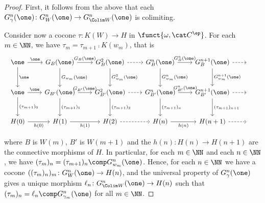 \begin{proof}
First, it follows from the above that each
$G_\gamma^n(\one) \colon G_W^n(\one) \to G_{\Colim W}^n(\one)$
is colimiting.

Consider now a cocone
$\tau \colon K(W) \to H$ in $\funct{\omega,\cat C^\ep}$.
For each $m \in \NN$, we have
$\tau_m = \tau_{m+1} \comp K(w_m)$,
that is
\begin{equation}
\label{diag:proof:scott:taucocone}
\begin{array}{c}
\begin{tikzcd}[column sep=2.14em, row sep=large]

  \one
  \arrow{r}[above]{\one}
  \arrow{d}{\one}
& G_{B}(\one)
   \arrow{r}[above]{G_{B}(\one)}
   \arrow{d}{G_{w_m}(\one)}
& G^2_{B}(\one)
   \arrow{d}{G_{w_m}^2(\one)}
  \arrow[dashed]{r}
& G^n_{B}(\one)
  \arrow{r}[above]{G_{B}^n(\one)}
  \arrow{d}{G_{w_m}^n(\one)}
& G^{n+1}_{B}(\one)
  \arrow{d}{G_{w_m}^{n+1}(\one)}
  \arrow[dashed]{r}
& \phantom{F}

\\

  \one
  \arrow{r}[above]{\one}
  \arrow{d}{(\tau_{m+1})_0}
& G_{B'}(\one)
   \arrow{r}[above]{G_{B'}(\one)}
   \arrow{d}{(\tau_{m+1})_1}
& G^2_{B'}(\one)
   \arrow{d}{(\tau_{m+1})_2}
  \arrow[dashed]{r}
& G^n_{B'}(\one)
  \arrow{r}[above]{G_{B'}^n(\one)}
  \arrow{d}{(\tau_{m+1})_n}
& G^{n+1}_{B'}(\one)
  \arrow{d}{(\tau_{m+1})_{n+1}}
  \arrow[dashed]{r}
& \phantom{F}

\\

  H(0)
  \arrow{r}[below]{h(0)}
& H(1)
   \arrow{r}[below]{h(1)}
& H(2)
  \arrow[dashed]{r}
& H(n)
  \arrow{r}[below]{h(n)}
& H(n+1)
  \arrow[dashed]{r}
& \phantom{F}
\end{tikzcd}
\end{array}
\end{equation}

\noindent
where $B$ is $W(m)$, $B'$ is $W(m+1)$
and the $h(n) \colon H(n) \to H(n+1)$ are the connective morphisms of $H$.
In particular, for each $m \in \NN$ and each $n \in \NN$,
we have $(\tau_m)_n = (\tau_{m+1})_n \comp G_{w_m}^n(\one)$.
Hence, for each $n \in \NN$ we have a cocone
$((\tau_m)_n)_m \colon G_W^n(\one) \to H(n)$,
and the universal property of $G_\gamma^n(\one)$
gives a unique morphism $\ell_n \colon G_{\Colim W}^n(\one) \to H(n)$
such that $(\tau_m)_n = \ell_n \comp G_{\gamma_m}^n(\one)$ for all $m \in \NN$.


\end{proof}
